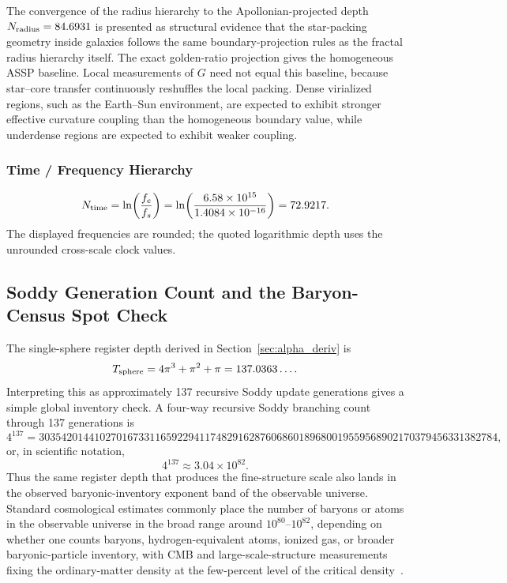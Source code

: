 \documentclass[11pt,a4paper]{article}
\begin{document}
The convergence of the radius hierarchy to the Apollonian-projected depth \(N_{\rm radius}=84.6931\) is presented as structural evidence that the star-packing geometry inside galaxies follows the same boundary-projection rules as the fractal radius hierarchy itself. The exact golden-ratio projection gives the homogeneous ASSP baseline. Local measurements of \(G\) need not equal this baseline, because star--core transfer continuously reshuffles the local packing. Dense virialized regions, such as the Earth--Sun environment, are expected to exhibit stronger effective curvature coupling than the homogeneous boundary value, while underdense regions are expected to exhibit weaker coupling.

\subsubsection{Time / Frequency Hierarchy}

\[
N_{\rm time}
=
\ln\!\left(\frac{f_e}{f_s}\right)
=
\ln\!\left(\frac{6.58\times10^{15}}{1.4084\times10^{-16}}\right)
=
72.9217.
\]
The displayed frequencies are rounded; the quoted logarithmic depth uses the unrounded cross-scale clock values.

\subsection{Soddy Generation Count and the Baryon-Census Spot Check}
\label{sec:baryon_count_spot_check}

The single-sphere register depth derived in Section~\ref{sec:alpha_deriv} is
\[
T_{\rm sphere}=4\pi^3+\pi^2+\pi=137.0363\ldots .
\]
Interpreting this as approximately 137 recursive Soddy update generations gives
a simple global inventory check. A four-way recursive Soddy branching count
through 137 generations is
\[
4^{137}
=
30354201441027016733116592294117482916287606860189680019559568902170379456331382784,
\]
or, in scientific notation,
\[
\boxed{4^{137}\approx3.04\times10^{82}}.
\]
Thus the same register depth that produces the fine-structure scale also lands
in the observed baryonic-inventory exponent band of the observable universe.
Standard cosmological estimates commonly place the number of baryons or atoms
in the observable universe in the broad range around \(10^{80}\)--\(10^{82}\),
depending on whether one counts baryons, hydrogen-equivalent atoms, ionized gas,
or broader baryonic-particle inventory, with CMB and large-scale-structure
measurements fixing the ordinary-matter density at the few-percent level of the
critical density~\cite{Planck2018VI,Page2016,Macquart2020}.
\end{document}
